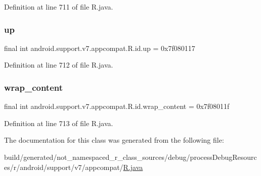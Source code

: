 Definition at line 711 of file R.\+java.

\mbox{\label{classandroid_1_1support_1_1v7_1_1appcompat_1_1_r_1_1id_a9aab36bc7e4cb601c12167a3b78ed738}} 
\subsubsection{\texorpdfstring{up}{up}}
{\footnotesize\ttfamily final int android.\+support.\+v7.\+appcompat.\+R.\+id.\+up = 0x7f080117\hspace{0.3cm}{\ttfamily [static]}}



Definition at line 712 of file R.\+java.

\mbox{\label{classandroid_1_1support_1_1v7_1_1appcompat_1_1_r_1_1id_a5263ea8cbb699c84a7171895a696e0c1}} 
\subsubsection{\texorpdfstring{wrap\_content}{wrap\_content}}
{\footnotesize\ttfamily final int android.\+support.\+v7.\+appcompat.\+R.\+id.\+wrap\+\_\+content = 0x7f08011f\hspace{0.3cm}{\ttfamily [static]}}



Definition at line 713 of file R.\+java.



The documentation for this class was generated from the following file\+:\begin{DoxyCompactItemize}
\item 
build/generated/not\+\_\+namespaced\+\_\+r\+\_\+class\+\_\+sources/debug/process\+Debug\+Resources/r/android/support/v7/appcompat/\mbox{\hyperlink{android_2support_2v7_2appcompat_2_r_8java}{R.\+java}}\end{DoxyCompactItemize}
